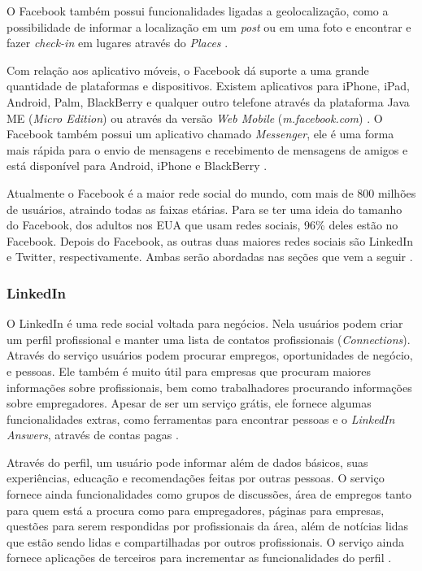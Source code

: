 \documentclass[diss]{template/setrem}
\begin{document}
O Facebook também possui funcionalidades ligadas a geolocalização, como a possibilidade de informar a localização em um \emph{post} ou em uma foto e encontrar e fazer \emph{check-in} em lugares através do \emph{Places} \citep{Facebook2012d}.

Com relação aos aplicativo móveis, o Facebook dá suporte a uma grande quantidade de plataformas e dispositivos. Existem aplicativos para iPhone, iPad, Android, Palm, BlackBerry e qualquer outro telefone através da plataforma Java ME (\emph{Micro Edition}) ou através da versão \emph{Web Mobile} (\emph{m.facebook.com}) \citep{Facebook2012e}. O Facebook também possui um aplicativo chamado \emph{Messenger}, ele é uma forma mais rápida para o envio de mensagens e recebimento de mensagens de amigos e está disponível para Android, iPhone e BlackBerry \citep{AndroidMarket2012a}.

Atualmente o Facebook é a maior rede social do mundo, com mais de 800 milhões de usuários, atraindo todas as faixas etárias. Para se ter uma ideia do tamanho do Facebook, dos adultos nos EUA que usam redes sociais, 96\% deles estão no Facebook. Depois do Facebook, as outras duas maiores redes sociais são LinkedIn e Twitter, respectivamente. Ambas serão abordadas nas seções que vem a seguir \citep{Banks2011, Facebook2012b}.

\subsubsection{LinkedIn}
O LinkedIn é uma rede social voltada para negócios. Nela usuários podem criar um perfil profissional e manter uma lista de contatos profissionais (\emph{Connections}). Através do serviço usuários podem procurar empregos, oportunidades de negócio, e pessoas. Ele também é muito útil para empresas que procuram maiores informações sobre profissionais, bem como trabalhadores procurando informações sobre empregadores. Apesar de ser um serviço grátis, ele fornece algumas funcionalidades extras, como ferramentas para encontrar pessoas e o \emph{LinkedIn Answers}, através de contas pagas \citep{CrunchBase2012a}.

Através do perfil, um usuário pode informar além de dados básicos, suas experiências, educação e recomendações feitas por outras pessoas. O serviço fornece ainda funcionalidades como grupos de discussões, área de empregos tanto para quem está a procura como para empregadores, páginas para empresas, questões para serem respondidas por profissionais da área, além de notícias lidas que estão sendo lidas e compartilhadas por outros profissionais. O serviço ainda fornece aplicações de terceiros para incrementar as funcionalidades do perfil \citep{LinkedIn2012a}.
\end{document}
